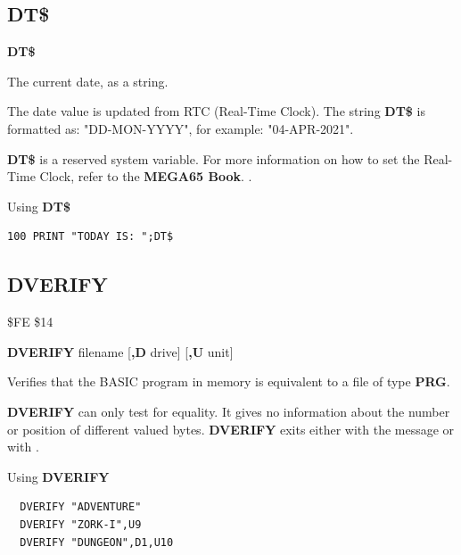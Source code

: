 \subsection{DT\$}
\begin{description}[leftmargin=2cm,style=nextline]
\item [Format:] {\bf DT\$}
\item [Usage:]  The current date, as a string.

                The date value is updated from RTC (Real-Time Clock).
                The string {\bf DT\$} is formatted as:
                "DD-MON-YYYY", for example: "04-APR-2021".
\item[Remarks:] {\bf DT\$} is a reserved system variable.
                For more information on how to set the Real-Time Clock,
                refer to
\ifdefined\printmanual
the {\bf MEGA65 Book}.
\else
 .
\fi

\item [Example:] Using {\bf DT\$}
\begin{tcolorbox}[colback=black,coltext=white]
\verbatimfont{\codefont}
\begin{verbatim}
100 PRINT "TODAY IS: ";DT$
\end{verbatim}
\end{tcolorbox}
\end{description}


\newpage
\subsection{DVERIFY}
\begin{description}[leftmargin=2cm,style=nextline]
\item [Token:] \$FE \$14
\item [Format:] {\bf DVERIFY} filename [{\bf,D} drive] [{\bf,U} unit]
\item [Usage:]
   Verifies that the BASIC program
   in memory is equivalent to a file of type {\bf PRG}.

   \filenamedefinition

   \drivedefinition

   \unitdefinition

\item [Remarks:]
   {\bf DVERIFY} can only test for equality. It gives no information
   about the number or position of different valued bytes.
    {\bf DVERIFY} exits either with the message 
    or with .

\item [Example:] Using {\bf DVERIFY}
\begin{tcolorbox}[colback=black,coltext=white]
\verbatimfont{\codefont}
\begin{verbatim}
  DVERIFY "ADVENTURE"
  DVERIFY "ZORK-I",U9
  DVERIFY "DUNGEON",D1,U10
\end{verbatim}
\end{tcolorbox}
\end{description}

